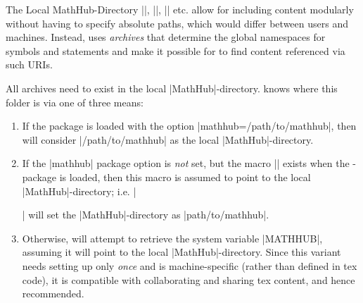 \begin{sfragment}{The Local MathHub-Directory}
    |\usemodule|, |\importmodule|, || etc. allow for 
    including content modularly without having to specify absolute
    paths, which would differ between users and machines. Instead,
    \sTeX uses \emph{archives} that determine the global
    namespaces for symbols and statements and make it possible
    for \sTeX to find content referenced via such URIs.

    All \sTeX archives need to exist in the local |MathHub|-directory.
    \sTeX knows where this folder is via one of three means:

    \begin{enumerate}
        \item If the \sTeX package is loaded with the option
            |mathhub=/path/to/mathhub|, then \sTeX will consider
            |/path/to/mathhub| as the local |MathHub|-directory.
        \item If the |mathhub| package option is \emph{not}
            set, but the macro |\mathhub| exists when the
            \sTeX-package is loaded, then this macro is
            assumed to point to the local |MathHub|-directory; i.e.
            |\def\mathhub{/path/to/mathhub}\usepackage{stex}|
            will set the |MathHub|-directory as |path/to/mathhub|.
        \item Otherwise, \sTeX will attempt to retrieve the
            system variable |MATHHUB|, assuming it will
            point to the local |MathHub|-directory. Since this
            variant needs setting up only \emph{once} and is 
            machine-specific (rather than defined in tex code), 
            it is compatible with collaborating and sharing tex 
            content, and hence recommended.
    \end{enumerate}
\end{sfragment}

